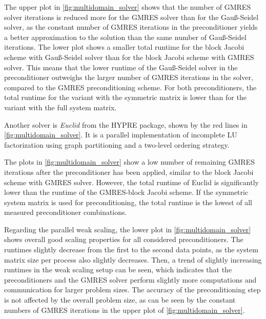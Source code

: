 The upper plot in \cref{fig:multidomain_solver} shows that the number of GMRES solver iterations is reduced more for the GMRES solver than for the Gauß-Seidel solver, as the constant number of GMRES iterations in the preconditioner yields a better approximation to the solution than the same number of Gauß-Seidel iterations. The lower plot shows a smaller total runtime for the block Jacobi scheme with Gauß-Seidel solver than for the block Jacobi scheme with GMRES solver. This means that the lower runtime of the Gauß-Seidel solver in the preconditioner outweighs the larger number of GMRES iterations in the solver, compared to the GMRES preconditioning scheme. For both preconditioners, the total runtime for the variant with the symmetric matrix is lower than for the variant with the full system matrix.

Another solver is \emph{Euclid} \cite{euclid} from the HYPRE package, shown by the red lines in \cref{fig:multidomain_solver}. It is a parallel implementation of incomplete LU factorization using graph partitioning and a two-level ordering strategy.

The plots in \cref{fig:multidomain_solver} show a low number of remaining GMRES iterations after the preconditioner has been applied, similar to the block Jacobi scheme with GMRES solver. However, the total runtime of Euclid is significantly lower than the runtime of the GMRES-block Jacobi scheme. If the symmetric system matrix is used for preconditioning, the total runtime is the lowest of all measured preconditioner combinations.

Regarding the parallel weak scaling, the lower plot in \cref{fig:multidomain_solver} shows overall good scaling properties for all considered preconditioners. The runtimes slightly decrease from the first to the second data points, as the system matrix size per process also slightly decreases. Then, a trend of slightly increasing runtimes in the weak scaling setup can be seen, which indicates that the preconditioners and the GMRES solver perform slightly more computations and communication for larger problem sizes. The accuracy of the preconditioning step is not affected by the overall problem size, as can be seen by the constant numbers of GMRES iterations in the upper plot of \cref{fig:multidomain_solver}.

